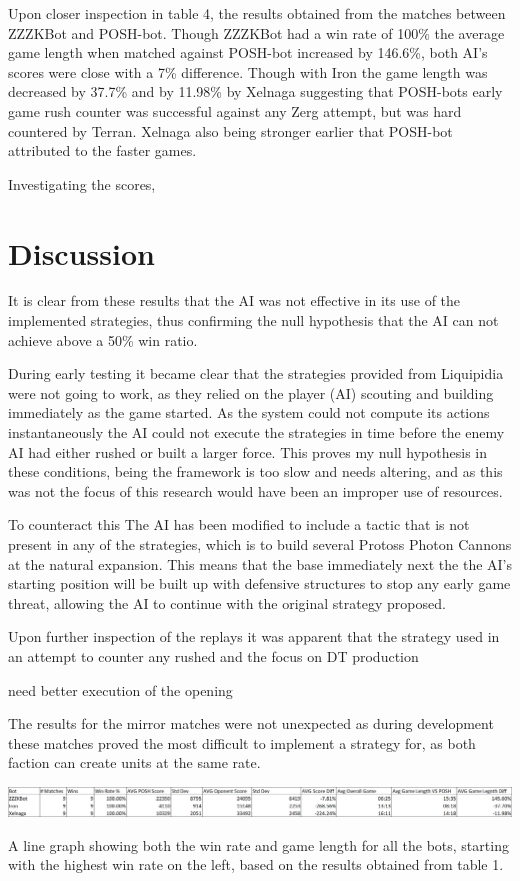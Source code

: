 \documentclass[journal]{IEEEtran}
\begin{document}
Upon closer inspection in table 4, the results obtained from the matches between ZZZKBot and POSH-bot. Though ZZZKBot had a win rate of 100\% the average game length when matched against POSH-bot increased by 146.6\%, both AI's scores were close with a 7\% difference. Though with Iron the game length was decreased by 37.7\% and by 11.98\% by Xelnaga suggesting that POSH-bots early game rush counter was successful against any Zerg attempt, but was hard countered by Terran. Xelnaga also being stronger earlier that POSH-bot attributed to the faster games.

Investigating the scores, 

\section{Discussion}
It is clear from these results that the AI was not effective in its use of the implemented strategies, thus confirming the null hypothesis that the AI can not achieve above a 50\% win ratio. 




During early testing it became clear that the strategies provided from Liquipidia were not going to work, as they relied on the player (AI) scouting and building immediately as the game started. As the system could not compute its actions instantaneously the AI could not execute the strategies in time before the enemy AI had either rushed or built a larger force. This proves my null hypothesis in these conditions, being the framework is too slow and needs altering, and as this was not the focus of this research would have been an improper use of resources.

To counteract this The AI has been modified to include a tactic that is not present in any of the strategies, which is to build several Protoss Photon Cannons at the natural expansion. This means that the base immediately next the the AI's starting position will be built up with defensive structures to stop any early game threat, allowing the AI to continue with the original strategy proposed.

Upon further inspection of the replays it was apparent that the strategy used in an attempt to counter any rushed and the focus on DT production

need better execution of the opening

The results for the mirror matches were not unexpected as during development these matches proved the most difficult to implement a strategy for, as both faction can create units at the same rate.
\begin{table}
	\centering
	\includegraphics[width=\textwidth]{PvsBots}
	\caption{A line graph showing both the win rate and game length for all the bots, starting with the highest win rate on the left, based on the results obtained from table 1.}
	\label{Table6}
\end{table}
\end{document}
